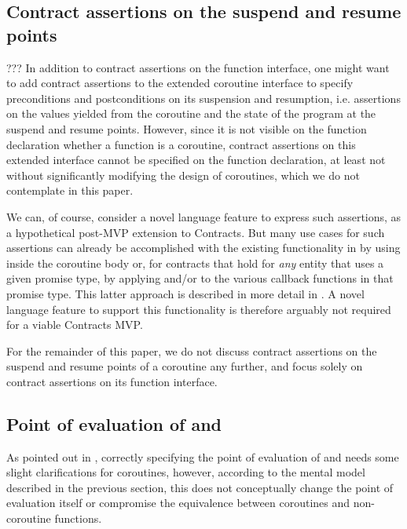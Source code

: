 \subsection{Contract assertions on the suspend and resume points}

??? In addition to contract assertions on the function interface, one might want to add contract assertions to the extended coroutine interface to specify preconditions and postconditions on its suspension and resumption, i.e. assertions on the values yielded from the coroutine and the state of the program at the suspend and resume points. However, since it is not visible on the function declaration whether a function is a coroutine, contract assertions on this extended interface cannot be specified on the function declaration, at least not without significantly modifying the design of coroutines, which we do not contemplate in this paper.

We can, of course, consider a novel language feature to express such assertions, as a hypothetical post-MVP extension to Contracts. But many use cases for such assertions can already be accomplished with the existing functionality in \cite{P2900R8} by using  inside the coroutine body or, for contracts that hold for \emph{any} entity that uses a given promise type, by applying  and/or  to the various callback functions in that promise type. This latter approach is described in more detail in \cite{P3251R0}. A novel language feature to support this functionality is therefore arguably not required for a viable Contracts MVP.

For the remainder of this paper, we do not discuss contract assertions on the suspend and resume points of a coroutine any further, and focus solely on contract assertions on its function interface.

\subsection{Point of evaluation of  and }

As pointed out in \cite{P2957R1}, correctly specifying the point of evaluation of  and  needs some slight clarifications for coroutines, however, according to the mental model described in the previous section, this does not conceptually change the point of evaluation itself or compromise the equivalence between coroutines and non-coroutine functions.

